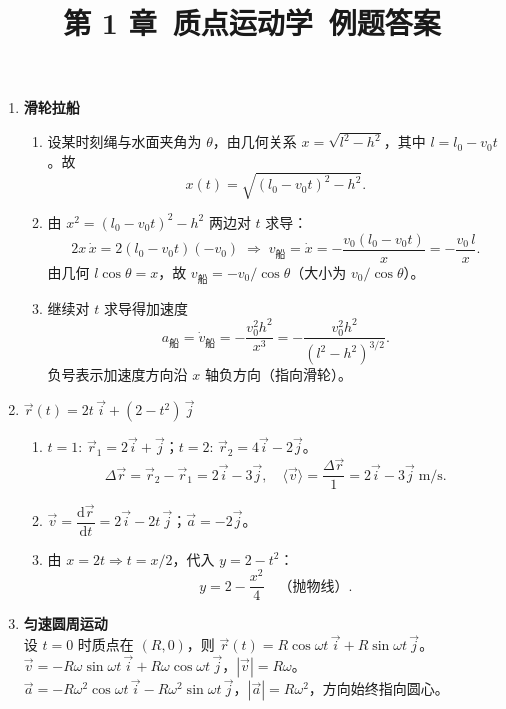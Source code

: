 \documentclass[12pt]{article}
\title{第 1 章\ 质点运动学\ 例题答案}
\author{}
\date{}
\begin{document}
\maketitle

\begin{enumerate}[label=\textbf{例\arabic*.}, leftmargin=*]

\item \textbf{滑轮拉船}
\begin{enumerate}[label=\textbf{解}（\arabic*）]
  \item 设某时刻绳与水面夹角为 $\theta$，由几何关系 $x = \sqrt{l^2 - h^2}$，其中 $l = l_0 - v_0 t$。故
  \[
    x(t) = \sqrt{(l_0 - v_0 t)^2 - h^2}.
  \]
  \item 由 $x^2 = (l_0 - v_0 t)^2 - h^2$ 两边对 $t$ 求导：
  \[
    2x\,\dot{x} = 2(l_0 - v_0 t)(-v_0) \;\Rightarrow\; v_{\text{船}} = \dot{x} = -\frac{v_0(l_0 - v_0 t)}{x} = -\frac{v_0\,l}{x}.
  \]
  由几何 $l\cos\theta = x$，故 $v_{\text{船}} = -v_0/\cos\theta$（大小为 $v_0/\cos\theta$）。
  \item 继续对 $t$ 求导得加速度
  \[
    a_{\text{船}} = \dot{v}_{\text{船}} = -\frac{v_0^2 h^2}{x^3} = -\frac{v_0^2 h^2}{(l^2 - h^2)^{3/2}}.
  \]
  负号表示加速度方向沿 $x$ 轴负方向（指向滑轮）。
\end{enumerate}

\item $\vec{r}(t) = 2t\,\vec{i} + (2-t^2)\,\vec{j}$
\begin{enumerate}[label=（\arabic*）]
  \item $t=1$: $\vec{r}_1 = 2\vec{i} + \vec{j}$；$t=2$: $\vec{r}_2 = 4\vec{i} - 2\vec{j}$。
  \[
    \Delta\vec{r} = \vec{r}_2 - \vec{r}_1 = 2\vec{i} - 3\vec{j},\quad \langle\vec{v}\rangle = \frac{\Delta\vec{r}}{1} = 2\vec{i} - 3\vec{j}\;\mathrm{m/s}.
  \]
  \item $\vec{v} = \dfrac{\mathrm{d}\vec{r}}{\mathrm{d}t} = 2\vec{i} - 2t\,\vec{j}$；$\vec{a} = -2\vec{j}$。
  \item 由 $x = 2t \Rightarrow t = x/2$，代入 $y = 2 - t^2$：
  \[
    y = 2 - \frac{x^2}{4}\quad\text{（抛物线）}.
  \]
\end{enumerate}

\item \textbf{匀速圆周运动}\\
设 $t=0$ 时质点在 $(R,0)$，则 $\vec{r}(t) = R\cos\omega t\,\vec{i} + R\sin\omega t\,\vec{j}$。\\
$\vec{v} = -R\omega\sin\omega t\,\vec{i} + R\omega\cos\omega t\,\vec{j}$，$|\vec{v}| = R\omega$。\\
$\vec{a} = -R\omega^2\cos\omega t\,\vec{i} - R\omega^2\sin\omega t\,\vec{j}$，$|\vec{a}| = R\omega^2$，方向始终指向圆心。


\end{enumerate}
\end{document}
